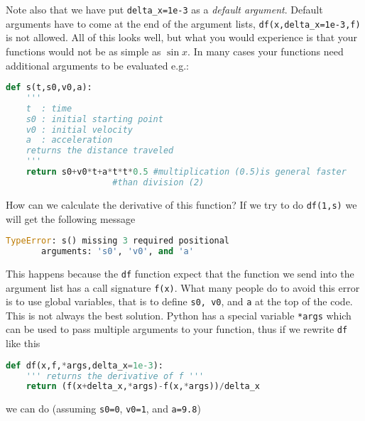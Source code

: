 \documentclass[graybox,sectrefs,envcountresetchap,open=right,final]{svmonodo}
\begin{document}
Note also that we have put \Verb!delta_x=1e-3! as a \emph{default argument}. Default arguments have to come at the end of the argument lists, \Verb!df(x,delta_x=1e-3,f)! is not allowed. All of this looks well, but what you would experience is that your functions would not be as simple as $\sin x$. In many cases your functions need additional arguments to be evaluated e.g.:











\begin{lstlisting}[language=python,style=blue1bar]
def s(t,s0,v0,a):
    '''
    t  : time
    s0 : initial starting point
    v0 : initial velocity
    a  : acceleration
    returns the distance traveled
    '''
    return s0+v0*t+a*t*t*0.5 #multiplication (0.5)is general faster
    	   		     #than division (2)

\end{lstlisting}

How can we calculate the derivative of this function? If we try to do \texttt{df(1,s)} we will get the following message



\begin{lstlisting}[language=python,style=blue1bar]
TypeError: s() missing 3 required positional
	   arguments: 's0', 'v0', and 'a'

\end{lstlisting}

This happens because the \texttt{df} function expect that the function we send into the argument list has a call signature \texttt{f(x)}. What many people do to avoid this error is to use global variables, that is to define \texttt{s0, v0}, and \texttt{a} at the top of the code. This is not always the best solution. Python has a special variable \texttt{*args} which can be used to pass multiple arguments to your function, thus if we rewrite \texttt{df} like this




\begin{lstlisting}[language=python,style=blue1bar]
def df(x,f,*args,delta_x=1e-3):
    ''' returns the derivative of f '''
    return (f(x+delta_x,*args)-f(x,*args))/delta_x

\end{lstlisting}

we can do (assuming \texttt{s0=0}, \texttt{v0=1}, and \texttt{a=9.8})
\end{document}
